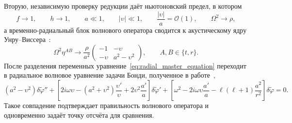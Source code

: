 \documentclass[12pt,a4paper,preprint,nopreprintline]{elsarticle}
\begin{document}
Вторую, независимую проверку редукции даёт ньютоновский предел, в котором
\begin{equation}
    f\rightarrow1,\qquad
    h\rightarrow1,\qquad
    a\ll1,\qquad
    |\upsilon|\ll1,
    \qquad
    \frac{|\upsilon|}{a}=\mathcal{O}(1),
    \qquad
    \Omega^{2}\rightarrow\rho,
    \label{eq:newtonian_limit}
\end{equation}
а временно-радиальный блок волнового оператора сводится к акустическому ядру Унру--Виссера~\cite{UnruhWG_ExperimentalBlackHoleEvaporation_1981,VisserM_AcousticBlackHolesHorizonsErgospheresAndHawkingRadiation_1998}:
\begin{equation}
    \Omega^{2}\eta^{AB}
    \longrightarrow
    \frac{\rho}{a^{2}}
    \begin{pmatrix}
        -1 & -\upsilon\\
        -\upsilon & a^{2}-\upsilon^{2}
    \end{pmatrix},
    \qquad A,B\in\{t,r\}.
    \label{eq:newtonian_acoustic_core}
\end{equation}
После разделения переменных уравнение~\eqref{eq:radial_master_equation} переходит в радиальное волновое уравнение задачи Бонди, полученное в работе~\cite{KovalenkoIG_EreminMA_SpatialInstabilityOfSphericalAccretion_1998},
\begin{equation}
    (a^{2}-\upsilon^{2})\delta\widetilde{\varphi}''
    +
    \left[
        2i\omega\upsilon
        -(a^{2}+\upsilon^{2})\frac{\upsilon'}{\upsilon}
        +2\upsilon^{2}\frac{a'}{a}
    \right]\delta\widetilde{\varphi}'
    +
    \left[
        \omega^{2}
        -2i\omega\upsilon\frac{a'}{a}
        -\ell(\ell+1)\frac{a^{2}}{r^{2}}
    \right]\delta\widetilde{\varphi}=0.
    \label{eq:kovalenko_eremin_limit}
\end{equation}
Такое совпадение подтверждает правильность волнового оператора и одновременно задаёт точку отсчёта для сравнения.
\end{document}
